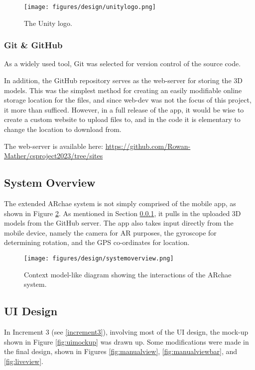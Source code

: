 \documentclass{article}
\begin{document}
\begin{figure}[h]
    \centering
    \texttt{[image: figures/design/unitylogo.png]}
        \caption{The Unity logo.}
        \label{fig:unitylogo}
\end{figure}

\subsubsection{Git \& GitHub}
\label{gitandgithub}
As a widely used tool, Git was selected for version control of the source code. 

In addition, the GitHub repository serves as the web-server for storing the 3D models. This was the simplest method for creating an easily modifiable online storage location for the files, and since web-dev was not the focus of this project, it more than sufficed. However, in a full release of the app, it would be wise to create a custom website to upload files to, and in the code it is elementary to change the location to download from.

The web-server is available here: \url{https://github.com/Rowan-Mather/csproject2023/tree/sites} \cite{tools:repo}

\subsection{System Overview}
The extended ARchae system is not simply comprised of the mobile app, as shown in Figure \ref{fig:systemoverview}. As mentioned in Section \ref{gitandgithub}, it pulls in the uploaded 3D models from the GitHub server. The app also takes input directly from the mobile device, namely the camera for AR purposes, the gyroscope for determining rotation, and the GPS co-ordinates for location.

\begin{figure}[h!]
    \centering
    \texttt{[image: figures/design/systemoverview.png]}
        \caption{Context model-like diagram showing the interactions of the ARchae system.}
        \label{fig:systemoverview}
\end{figure}

\subsection{UI Design}
\label{uidesign}
In Increment 3 (see \ref{increment3}), involving most of the UI design, the mock-up shown in Figure \ref{fig:uimockup} was drawn up. Some modifications were made in the final design, shown in Figures \ref{fig:manualview}, \ref{fig:manualviewbar}, and \ref{fig:liveview}.
\end{document}
